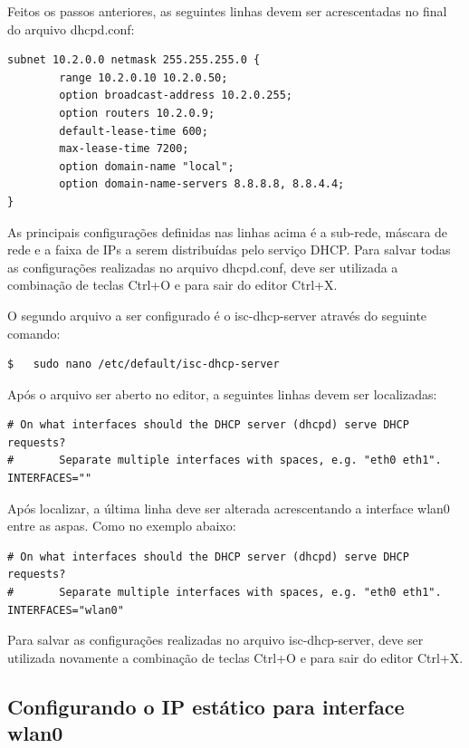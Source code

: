 Feitos os passos anteriores, as seguintes linhas devem ser acrescentadas no final do arquivo dhcpd.conf: \\

\begin{lstlisting}
subnet 10.2.0.0 netmask 255.255.255.0 {
		range 10.2.0.10 10.2.0.50;
		option broadcast-address 10.2.0.255;
		option routers 10.2.0.9;
		default-lease-time 600;
		max-lease-time 7200;
		option domain-name "local";
		option domain-name-servers 8.8.8.8, 8.8.4.4;
}
\end{lstlisting}

As principais configurações definidas nas linhas acima é a sub-rede, máscara de rede e a faixa de IPs a serem distribuídas pelo serviço DHCP. Para salvar todas as configurações realizadas no arquivo dhcpd.conf, deve ser utilizada a combinação de teclas Ctrl+O e para sair do editor Ctrl+X.

O segundo arquivo a ser configurado é o isc-dhcp-server através do seguinte comando: \\

\begin{lstlisting}[language=bash]
$   sudo nano /etc/default/isc-dhcp-server
\end{lstlisting}

Após o arquivo ser aberto no editor, a seguintes linhas devem ser localizadas: \\

\begin{lstlisting}
# On what interfaces should the DHCP server (dhcpd) serve DHCP requests?
#       Separate multiple interfaces with spaces, e.g. "eth0 eth1".
INTERFACES=""
\end{lstlisting}

Após localizar, a última linha deve ser alterada acrescentando a interface wlan0 entre as aspas. Como no exemplo abaixo: \\

\begin{lstlisting}
# On what interfaces should the DHCP server (dhcpd) serve DHCP requests?
#       Separate multiple interfaces with spaces, e.g. "eth0 eth1".
INTERFACES="wlan0"
\end{lstlisting}

Para salvar as configurações realizadas no arquivo isc-dhcp-server, deve ser utilizada novamente a combinação de teclas Ctrl+O e para sair do editor Ctrl+X.

\subsection{Configurando o IP estático para interface wlan0}
\label{sec:ip-estatico-wlan0}

